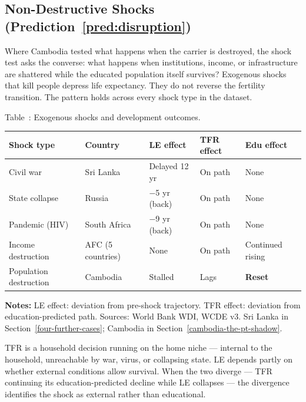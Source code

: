 \documentclass[12pt,letterpaper]{article}
\begin{document}
\subsection{Non-Destructive Shocks (Prediction~\ref{pred:disruption})}\label{the-shock-test}

Where Cambodia tested what happens when the carrier is destroyed,
the shock test asks the converse: what happens when institutions,
income, or infrastructure are shattered while the educated population
itself survives? Exogenous shocks that kill people depress life
expectancy. They do not reverse the fertility transition. The pattern holds across every shock type in the dataset.

\label{tab:shock}Table~\thetable: Exogenous shocks and development outcomes.

{\small
\begin{longtable}[]{@{}
  >{\raggedright\arraybackslash}p{}
  >{\raggedright\arraybackslash}p{}
  >{\raggedright\arraybackslash}p{}
  >{\raggedright\arraybackslash}p{}
  >{\raggedright\arraybackslash}p{}@{}}
\toprule
Shock type & Country & LE effect & TFR effect & Edu effect \\
\midrule
\endhead
Civil war & Sri Lanka & Delayed 12 yr & On path & None \\
State collapse & Russia & $-$5 yr (back) & On path & None \\
Pandemic (HIV) & South Africa & $-$9 yr (back) & On path & None \\
Income destruction & AFC (5 countries) & None & On path & Continued rising \\
Population destruction & Cambodia & Stalled & Lags & \textbf{Reset} \\
\bottomrule
\end{longtable}
}

\begin{minipage}{\dimexpr\textwidth-2em}
\scriptsize
\textbf{Notes:} LE effect: deviation from pre-shock trajectory. TFR
effect: deviation from education-predicted path. Sources: World Bank
WDI, WCDE v3. Sri Lanka in Section~\ref{four-further-cases}; Cambodia in
Section~\ref{cambodia-the-pt-shadow}.
\end{minipage}

TFR is a household decision running on the home niche --- internal to
the household, unreachable by war, virus, or collapsing state. LE depends partly on
whether external conditions allow survival. When the two diverge --- TFR
continuing its education-predicted decline while LE collapses --- the
divergence identifies the shock as external rather than educational.
\end{document}
